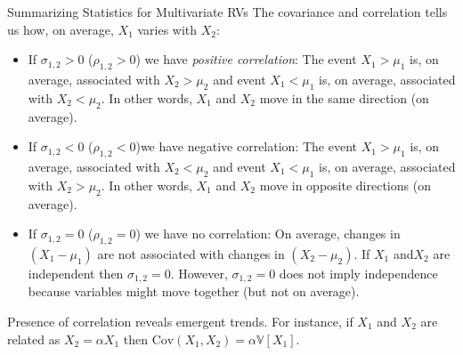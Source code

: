 \documentclass[9pt]{beamer}
\begin{document}
%
\begin{frame}{Summarizing Statistics for Multivariate RVs}
The covariance and correlation tells us how, on average, $X_1$ varies with $X_2$: 

\begin{block}{}
\begin{itemize}
\item If $\sigma_{1,2}>0$ ($\rho_{1,2}>0$) we have {\em positive correlation}: The event $X_1>\mu_1$  is, on average, associated with $X_2>\mu_2$ and event $X_1<\mu_1$  is, on average, associated with $X_2<\mu_2$.  In other words, $X_1$ and $X_2$ move in the same direction (on average).

\item If $\sigma_{1,2}<0$  ($\rho_{1,2}<0$)we have negative correlation: The event $X_1>\mu_1$  is, on average, associated with $X_2<\mu_2$ and event $X_1<\mu_1$  is, on average, associated with $X_2>\mu_2$. In other words, $X_1$ and $X_2$ move in opposite directions (on average). 

\item If $\sigma_{1,2}=0$ ($\rho_{1,2}=0$) we have no correlation: On average, changes in $(X_1-\mu_1)$ are not associated with changes in $(X_2-\mu_2)$. If $X_1$ and$X_2$ are independent then $\sigma_{1,2}=0$. However, $\sigma_{1,2}=0$ does not imply independence because variables might move together (but not on average).
\end{itemize}
\end{block}
Presence of correlation reveals emergent trends. For instance, if $X_1$ and $X_2$ are related as $X_2=\alpha X_1$ then $\textrm{Cov}(X_1,X_2)=\alpha \mathbb{V}[X_1]$. 

\end{frame}
\end{document}
